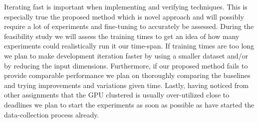 \documentclass[a4paper,11pt]{article}
\begin{document}
 Iterating fast is important when implementing and verifying techniques. This is especially true the proposed method which is novel approach and will possibly require a lot of experiments and fine-tuning to accurately be assessed. During the feasibility study we will assess the training times to get an idea of how many experiments could realistically run it our time-span. If training times are too long we plan to make development iteration faster by using a smaller dataset and/or by reducing the input dimensions. Furthermore, if our proposed method fails to provide comparable performance we plan on thoroughly comparing the baselines and trying improvements and variations given time. Lastly, having noticed from other assignments that the GPU clustered is usually over-utilized close to deadlines we plan to start the experiments as soon as possible as have started the data-collection process already. 



\end{document}
